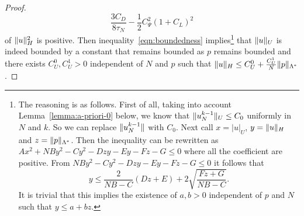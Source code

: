 \documentclass[a4paper,10pt,twoside]{amsbook}
\numberwithin{section}{chapter}
\numberwithin{equation}{chapter}
\theoremstyle{definition}
\DeclarePairedDelimiter{\norm}{\lVert}{\rVert}
\begin{document}
\begin{proof}
\[
\frac{3C_D}{8\tau_N}-\frac{1}{2}C_{\Psi}^2(1+C_L)^2
\]
of $\norm{u}_H^2$ is positive. Then inequality~\eqref{eqn:boundedness} implies\footnote{The reasoning is as follows. First of all, taking into account Lemma~\ref{lemma:a-priori-0} below, we know that $\norm{u_N^{k-1}}_U\le C_0$ uniformly in $N$ and $k$. So we can replace $\norm{u_N^{k-1}}$ with $C_0$. Next call $x=|u|_U$, $y=\norm{u}_H$ and $z=\norm{p}_{\Lambda^*}$. Then the inequality can be rewritten as $Ax^2+NB y^2-Cy^2-Dzy-Ey-Fz-G\le0$ where all the coefficient are positive. From $NB y^2-Cy^2-Dzy-Ey-Fz-G\le0$ it follows that
\[
y\le\frac{2}{NB-C}(Dz+E)+2\sqrt{\frac{Fz+G}{NB-C}}.
\]
It is trivial that this implies the existence of $a,b>0$ independent of $p$ and $N$ such that $y\le a+bz$.} that $\norm{u}_U$ is indeed bounded by a constant that remains bounded as $p$ remains bounded and there exists $C_U^0,C_U^1>0$ independent of $N$ and $p$ such that $\norm{u}_H\le C_U^0+\frac{C_U^1}{N}\norm{p}_{\Lambda^*}$.


\end{proof}
\end{document}
